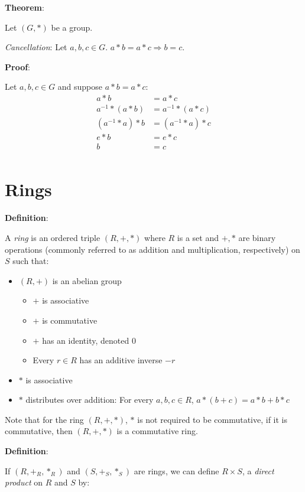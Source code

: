 \documentclass{article}
\begin{document}
\begin{multicols*}{2}
\textbf{Theorem}:

Let $(G, *)$ be a group. 

\textit{Cancellation}: Let $a,b,c \in G$. $a * b = a* c \Rightarrow b = c$.

\textbf{Proof}:

Let $a,b,c \in G$ and suppose $a*b = a*c$:\[\begin{aligned}
    a*b &= a*c \\
    a^{-1}*(a*b) &= a^{-1}*(a*c) \\
    (a^{-1}*a)*b &= (a^{-1}*a)*c \\
    e*b &= e*c \\
    b &= c \\
\end{aligned}\]

\section{Rings}

\textbf{Definition}:

A \textit{ring} is an ordered triple $(R, +, *)$ where $R$ is a set and $+, *$ are binary operations (commonly referred to as addition and multiplication, respectively) on $S$ such that:

\begin{itemize}
    \item $(R, +)$ is an abelian group
    \begin{itemize}
        \item $+$ is associative
        \item $+$ is commutative
        \item $+$ has an identity, denoted $0$
        \item Every $r \in R$ has an additive inverse $-r$
    \end{itemize}
    \item $*$ is associative
    \item $*$ distributes over addition: For every $a, b, c \in R$, $a * (b + c) = a * b + b * c$
\end{itemize}


Note that for the ring $(R, +, *)$, $*$ is not required to be commutative, if it is commutative, then $(R, +, *)$ is a commutative ring.

\textbf{Definition}:

If $(R, +_R,*_R)$ and $(S, +_S,*_S)$ are rings, we can define $R \times S$, a \textit{direct product} on $R$ and $S$ by:


\end{multicols*}
\end{document}
